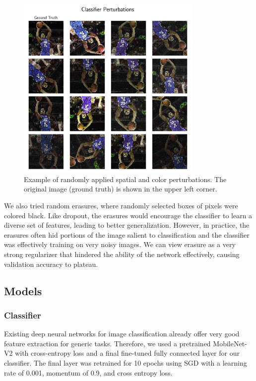 \documentclass[justified]{article}
\begin{document}
  \begin{figure}[H]
    \centering
    \includegraphics[width=0.8\textwidth]{figures/perturb.png}
    \caption{
      Example of randomly applied spatial and color perturbations.
      The original image (ground truth) is shown in the upper left corner.
    }
  \end{figure}

  We also tried random erasures, where randomly selected boxes of pixels were colored black.
  Like dropout, the erasures would encourage the classifier to learn a diverse set of features, leading to better generalization.
  However, in practice, the erasures often hid portions of the image salient to classification and the classifier was effectively training on very noisy images.
  We can view erasure as a very strong regularizer that hindered the ability of the network effectively, causing validation accuracy to plateau.

  \subsection{Models}

  \subsubsection{Classifier}

  Existing deep neural networks for image classification already offer very good feature extraction for generic tasks.
  Therefore, we used a pretrained MobileNet-V2 with cross-entropy loss and a final fine-tuned fully connected layer for our classifier.
  The final layer was retrained for 10 epochs using SGD with a learning rate of 0.001, momentum of 0.9, and cross entropy loss.
\end{document}
